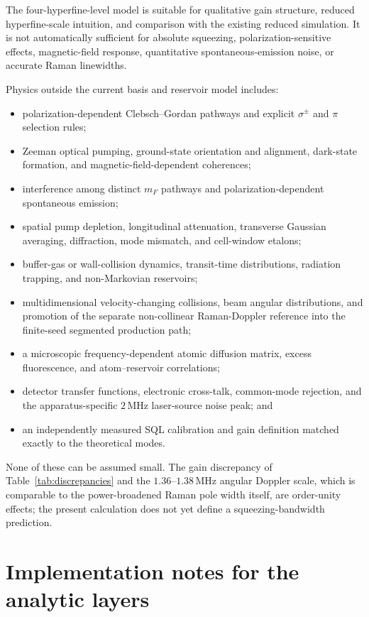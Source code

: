 \documentclass[11pt,a4paper]{article}
\newcommand{\MHz}{\,\mathrm{MHz}}
\begin{document}
The four-hyperfine-level model is suitable for qualitative gain structure,
reduced hyperfine-scale intuition, and comparison with the existing reduced
simulation. It is not automatically sufficient for absolute squeezing,
polarization-sensitive effects, magnetic-field response, quantitative
spontaneous-emission noise, or accurate Raman linewidths.

Physics outside the current basis and reservoir model includes:
\begin{itemize}
\item polarization-dependent Clebsch--Gordan pathways and explicit
$\sigma^\pm$ and $\pi$ selection rules;
\item Zeeman optical pumping, ground-state orientation and alignment,
dark-state formation, and magnetic-field-dependent coherences;
\item interference among distinct $m_F$ pathways and
polarization-dependent spontaneous emission;
\item spatial pump depletion, longitudinal attenuation, transverse
Gaussian averaging, diffraction, mode mismatch, and cell-window etalons;
\item buffer-gas or wall-collision dynamics, transit-time distributions,
radiation trapping, and non-Markovian reservoirs;
\item multidimensional velocity-changing collisions, beam angular
distributions, and promotion of the separate non-collinear Raman-Doppler
reference into the finite-seed segmented production path;
\item a microscopic frequency-dependent atomic diffusion matrix, excess
fluorescence, and atom--reservoir correlations;
\item detector transfer functions, electronic cross-talk, common-mode
rejection, and the apparatus-specific $2\MHz$ laser-source noise peak; and
\item an independently measured SQL calibration and gain definition
matched exactly to the theoretical modes.
\end{itemize}

None of these can be assumed small. The gain discrepancy of
Table~\ref{tab:discrepancies} and the $1.36$--$1.38\MHz$ angular Doppler
scale, which is comparable to the power-broadened Raman pole width itself,
are order-unity effects; the present calculation does not yet define a
squeezing-bandwidth prediction.

\section{Implementation notes for the analytic layers}
\label{app:implementation}
\end{document}
